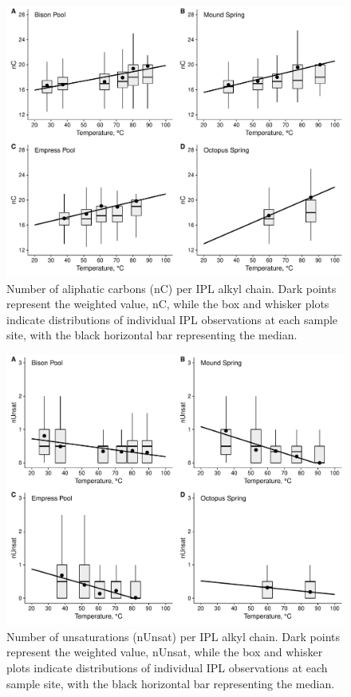 \singlespace
\begin{figure}[h]
\centering
\includegraphics[width=1\linewidth]{"figs_ch1/boxplot - alkyl chain nC"}
\caption[Number of aliphatic carbons (nC) per IPL alkyl chain]{Number of aliphatic carbons (nC) per IPL alkyl chain. Dark points represent the weighted value, nC, while the box and whisker plots indicate distributions of individual IPL observations at each sample site, with the black horizontal bar representing the median.}
\label{fig:nC}
\end{figure}
\doublespace


\singlespace
\begin{figure}[h]
\centering
\includegraphics[width=1\linewidth]{"figs_ch1/boxplot - alkyl chain nUnsat"}
\caption[Number of unsaturations (nUnsat) per IPL alkyl chain]{Number of unsaturations (nUnsat) per IPL alkyl chain. Dark points represent the weighted value, nUnsat, while the box and whisker plots indicate distributions of individual IPL observations at each sample site, with the black horizontal bar representing the median.}
\label{fig:nUnsat}
\end{figure}
\doublespace


